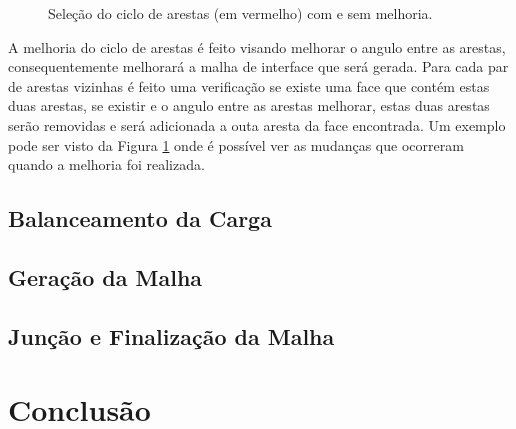 \begin{figure}[ht]
{	}
	\caption{Seleção do ciclo de arestas (em vermelho) com e sem melhoria.}
	\label{fig:melhoria_arestas_faces}
\end{figure}


A melhoria do ciclo de arestas é feito visando melhorar o angulo entre as arestas, consequentemente melhorará a malha de interface que será gerada. Para cada par de arestas vizinhas é feito uma verificação se existe uma face que contém estas duas arestas, se existir e o angulo entre as arestas melhorar, estas duas arestas serão removidas e será adicionada a outa aresta da face encontrada. Um exemplo pode ser visto da Figura \ref{fig:melhoria_arestas_faces} onde é possível ver as mudanças que ocorreram quando a melhoria foi realizada.

\subsection{Balanceamento da Carga}


\subsection{Geração da Malha}


\subsection{Junção e Finalização da Malha}


\section{Conclusão}
